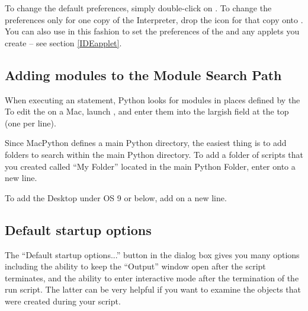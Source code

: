 To change the default preferences, simply double-click on
. To change the preferences only for one copy
of the Interpreter, drop the icon for that copy onto
.  You can also use 
in this fashion to set the preferences of the  and
any applets you create -- see section %
\ref{IDEapplet}.

\subsection{Adding modules to the Module Search Path
            \label{search-path}}

When executing an  statement, Python looks for modules
in places defined by the  To edit the
 on a Mac, launch , and
enter them into the largish field at the top (one per line).

Since MacPython defines a main Python directory, the easiest thing is
to add folders to search within the main Python directory. To add a
folder of scripts that you created called ``My Folder'' located in the
main Python Folder, enter  onto a new line.

To add the Desktop under OS 9 or below, add
 on a new line.

\subsection{Default startup options \label{defaults}}


The ``Default startup options...'' button in the
 dialog box gives you many options including
the ability to keep the ``Output'' window open after the script
terminates, and the ability to enter interactive mode after the
termination of the run script. The latter can be very helpful if you
want to examine the objects that were created during your script.


